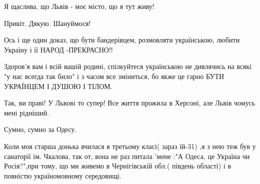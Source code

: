 \begin{itemize}
 
Я щаслива, що Львів - моє місто, що я тут живу!

 
Привіт. Дякую. Шануймося!

 

Ось і ще один доказ, що бути бандерівцем, розмовляти українською, любити
Україну і її НАРОД -ПРЕКРАСНО!!

Здоров'я вам і всій вашій родині, спілкуйтеся українською не дивлячись на всякі
"у нас всегда так било" і з часом все зміниться, бо якже це гарно БУТИ
УКРАЇНЦЕМ І ДУШОЮ І ТІЛОМ.


 
Так, ви праві! У Львові то супер! Все життя прожила в Херсоні, але Львів чомусь мені рідніший.

 

Сумно, сумно за Одесу.

Коли моя старша донька вчилася в третьому класі( зараз їй-31) ,я з нею теж був
у санаторії ім. Чкалова, так от, вона не раз питала 'мене :"А Одеса, це Україна чи
Росія?",при тому, що ми живемо в Чернігівській обл.( південь області) і в
повністю україномовному середовищі.


 

\end{itemize}
